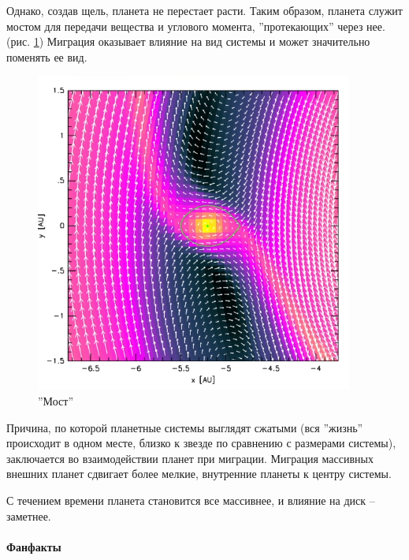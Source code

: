 Однако, создав щель, планета не перестает расти. Таким образом, планета служит мостом для передачи вещества и углового момента, ''протекающих'' через нее.(рис. \ref{fig:4_brige})
Миграция оказывает влияние на вид системы и может значительно поменять ее вид. 
\begin{figure}
  \begin{center}
    \includegraphics[width=\linewidth]{Pictures/4_brige.png}
  \end{center}
  \caption{''Мост''}
  \label{fig:4_brige}
\end{figure}
Причина, по которой планетные системы выглядят сжатыми (вся ''жизнь'' происходит в одном месте, близко к звезде по сравнению с размерами системы), заключается во взаимодействии планет при миграции. Миграция массивных внешних планет сдвигает более мелкие, внутренние планеты к центру системы.

С течением времени планета становится все массивнее, и влияние на диск -- заметнее.

\paragraph{Фанфакты}

